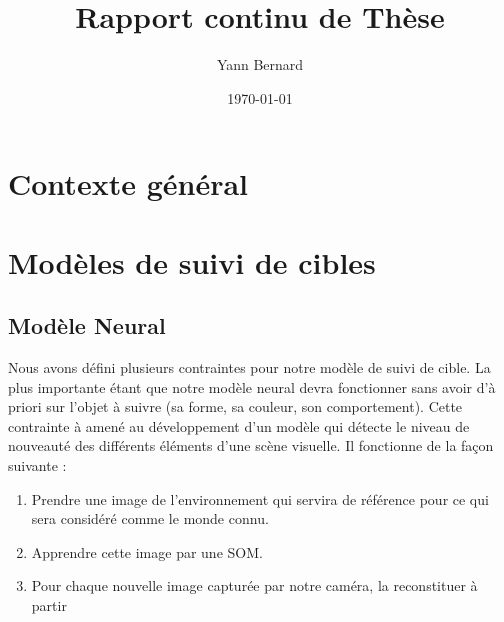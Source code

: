 \documentclass[12pt]{report}
\title{\vspace{-2cm}Rapport continu de Thèse}
\author{Yann Bernard}
\date{\today}
\begin{document}
\maketitle

\chapter{Contexte général}

\chapter{Modèles de suivi de cibles}

\section{Modèle Neural}

Nous avons défini plusieurs contraintes pour notre modèle de suivi de cible. La plus importante étant que notre modèle neural devra fonctionner sans avoir d'à priori sur l'objet à suivre (sa forme, sa couleur, son comportement). Cette contrainte à amené au développement d'un modèle qui détecte le niveau de nouveauté des différents éléments d'une scène visuelle. Il fonctionne de la façon suivante : 
\begin{enumerate}
    \item Prendre une image de l'environnement qui servira de référence pour ce qui sera considéré comme le monde connu.
    \item Apprendre cette image par une SOM.
    \item Pour chaque nouvelle image capturée par notre caméra, la reconstituer à partir 
\end{enumerate}
\end{document}
